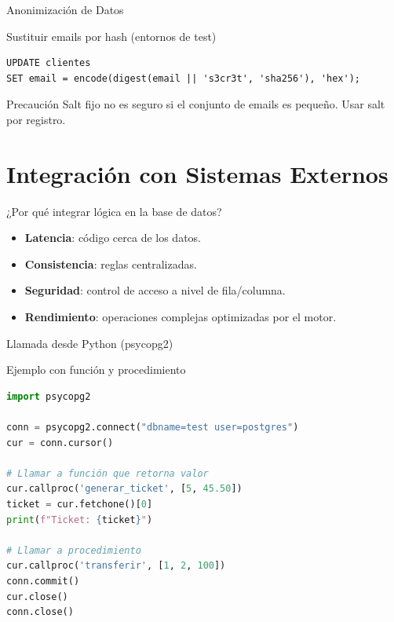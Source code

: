 \documentclass[aspectratio=169, 10pt, xcolor=table]{beamer}
\begin{document}
\begin{frame}[fragile]{Anonimización de Datos}
    \begin{block}{Sustituir emails por hash (entornos de test)}
        \begin{lstlisting}
UPDATE clientes
SET email = encode(digest(email || 's3cr3t', 'sha256'), 'hex');
        \end{lstlisting}
    \end{block}
    \begin{alertblock}{Precaución}
        Salt fijo no es seguro si el conjunto de emails es pequeño. Usar salt por registro.
    \end{alertblock}
\end{frame}

\section{Integración con Sistemas Externos}

\begin{frame}{¿Por qué integrar lógica en la base de datos?}
    \begin{itemize}
        \item \textbf{Latencia}: código cerca de los datos.
        \item \textbf{Consistencia}: reglas centralizadas.
        \item \textbf{Seguridad}: control de acceso a nivel de fila/columna.
        \item \textbf{Rendimiento}: operaciones complejas optimizadas por el motor.
    \end{itemize}
\end{frame}

\begin{frame}[fragile]{Llamada desde Python (psycopg2)}
    \begin{block}{Ejemplo con función y procedimiento}
        \begin{lstlisting}[language=Python]
import psycopg2

conn = psycopg2.connect("dbname=test user=postgres")
cur = conn.cursor()

# Llamar a función que retorna valor
cur.callproc('generar_ticket', [5, 45.50])
ticket = cur.fetchone()[0]
print(f"Ticket: {ticket}")

# Llamar a procedimiento
cur.callproc('transferir', [1, 2, 100])
conn.commit()
cur.close()
conn.close()
        \end{lstlisting}
    \end{block}
\end{frame}
\end{document}
